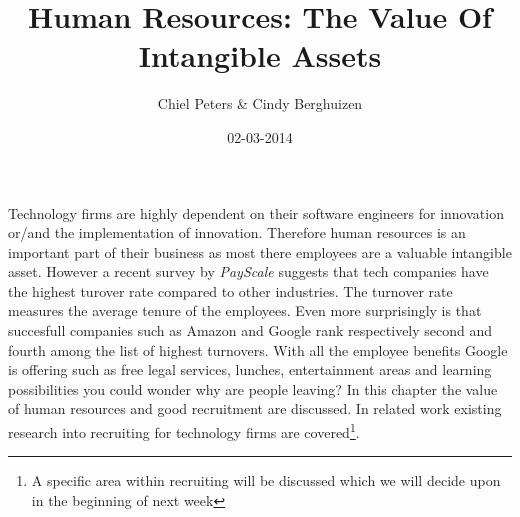 \documentclass{article}
\begin{document}
\title{Human Resources: The Value Of Intangible Assets}
\author{Chiel Peters \& Cindy Berghuizen}
\date{02-03-2014}
\maketitle

\setlength\parindent{0pt}

Technology firms are highly dependent on their software engineers for innovation or/and the implementation of innovation. Therefore human resources is an important part of their business as most there employees are a valuable intangible asset. However a recent survey by \textit{PayScale} \cite{turnover} suggests that tech companies have the highest turover rate compared to other industries. The turnover rate measures the average tenure of the employees. Even more surprisingly is that succesfull companies such as Amazon and Google rank respectively second and fourth among the list of highest turnovers. With all the employee benefits Google is offering such as free legal services, lunches, entertainment areas and learning possibilities you could wonder why are people leaving? In this chapter the value of human resources and good recruitment are discussed. In related work existing research into recruiting for technology firms are covered\footnote{A specific area within recruiting will be discussed which we will decide upon in the beginning of next week}.
\end{document}

